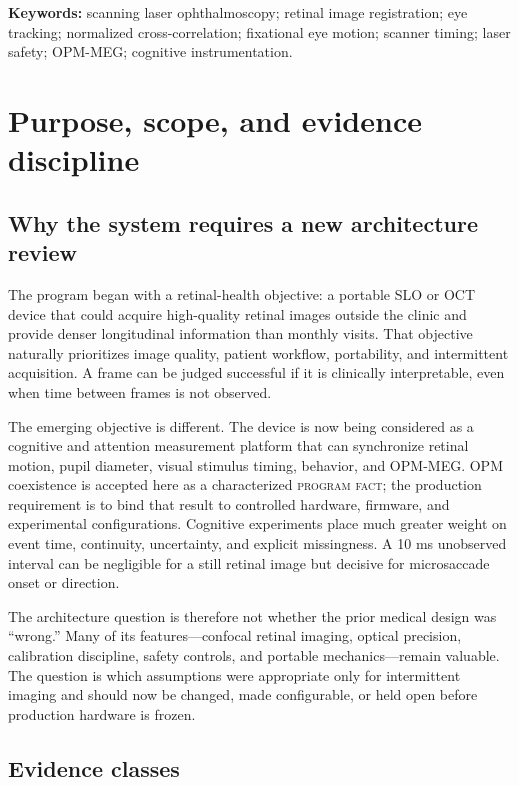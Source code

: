 \documentclass[11pt]{article}
\newcommand{\programfact}{\textsc{\color{Navy}program fact}}
\begin{document}
\textbf{Keywords:} scanning laser ophthalmoscopy; retinal image registration; eye tracking;
normalized cross-correlation; fixational eye motion; scanner timing; laser safety; OPM-MEG;
cognitive instrumentation.

\tableofcontents
\newpage

\section{Purpose, scope, and evidence discipline}

\subsection{Why the system requires a new architecture review}

The program began with a retinal-health objective: a portable SLO or OCT device that could acquire
high-quality retinal images outside the clinic and provide denser longitudinal information than
monthly visits. That objective naturally prioritizes image quality, patient workflow, portability,
and intermittent acquisition. A frame can be judged successful if it is clinically interpretable,
even when time between frames is not observed.

The emerging objective is different. The device is now being considered as a cognitive and
attention measurement platform that can synchronize retinal motion, pupil diameter, visual
stimulus timing, behavior, and OPM-MEG. OPM coexistence is accepted here as a characterized
\programfact; the production requirement is to bind that result to controlled hardware,
firmware, and experimental configurations. Cognitive experiments place much greater weight on
event time, continuity, uncertainty, and explicit missingness. A 10 ms unobserved interval can be
negligible for a still retinal image but decisive for microsaccade onset or direction.

The architecture question is therefore not whether the prior medical design was ``wrong.'' Many
of its features---confocal retinal imaging, optical precision, calibration discipline, safety
controls, and portable mechanics---remain valuable. The question is which assumptions were
appropriate only for intermittent imaging and should now be changed, made configurable, or held
open before production hardware is frozen.

\subsection{Evidence classes}
\end{document}
